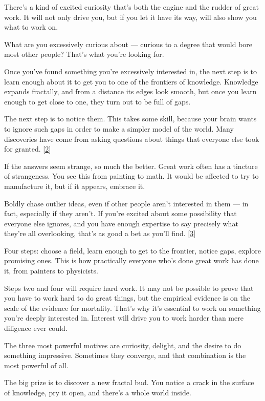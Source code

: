 There's a kind of excited curiosity that's both the engine and the
rudder of great work. It will not only drive you, but if you let it have
its way, will also show you what to work on.

What are you excessively curious about --- curious to a degree that
would bore most other people? That's what you're looking for.

Once you've found something you're excessively interested in, the next
step is to learn enough about it to get you to one of the frontiers of
knowledge. Knowledge expands fractally, and from a distance its edges
look smooth, but once you learn enough to get close to one, they turn
out to be full of gaps.

The next step is to notice them. This takes some skill, because your
brain wants to ignore such gaps in order to make a simpler model of the
world. Many discoveries have come from asking questions about things
that everyone else took for granted. {[}\hyperref[f2n]{2}{]}

If the answers seem strange, so much the better. Great work often has a
tincture of strangeness. You see this from painting to math. It would be
affected to try to manufacture it, but if it appears, embrace it.

Boldly chase outlier ideas, even if other people aren't interested in
them --- in fact, especially if they aren't. If you're excited about
some possibility that everyone else ignores, and you have enough
expertise to say precisely what they're all overlooking, that's as good
a bet as you'll find. {[}\hyperref[f3n]{3}{]}

Four steps: choose a field, learn enough to get to the frontier, notice
gaps, explore promising ones. This is how practically everyone who's
done great work has done it, from painters to physicists.

Steps two and four will require hard work. It may not be possible to
prove that you have to work hard to do great things, but the empirical
evidence is on the scale of the evidence for mortality. That's why it's
essential to work on something you're deeply interested in. Interest
will drive you to work harder than mere diligence ever could.

The three most powerful motives are curiosity, delight, and the desire
to do something impressive. Sometimes they converge, and that
combination is the most powerful of all.

The big prize is to discover a new fractal bud. You notice a crack in
the surface of knowledge, pry it open, and there's a whole world inside.

